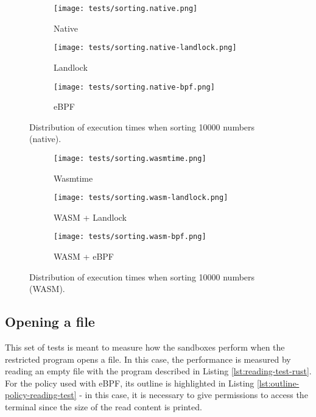 \begin{figure}[ht]
  \centering
  \begin{subfigure}[b]{0.32\textwidth}
    \centering
    \texttt{[image: tests/sorting.native.png]}
    \caption{Native}
  \end{subfigure}
  \begin{subfigure}[b]{0.32\textwidth}
    \centering
    \texttt{[image: tests/sorting.native-landlock.png]}
    \caption{Landlock}
  \end{subfigure}
  \begin{subfigure}[b]{0.32\textwidth}
    \centering
    \texttt{[image: tests/sorting.native-bpf.png]}
    \caption{eBPF}
  \end{subfigure}
  \caption{Distribution of execution times when sorting 10000 numbers (native).}
  \label{fig:distribution-sorting-native}
\end{figure}

\begin{figure}[ht!]
  \centering
  \begin{subfigure}[b]{0.32\textwidth}
    \centering
    \texttt{[image: tests/sorting.wasmtime.png]}
    \caption{Wasmtime}
  \end{subfigure}
  \begin{subfigure}[b]{0.32\textwidth}
    \centering
    \texttt{[image: tests/sorting.wasm-landlock.png]}
    \caption{WASM + Landlock}
  \end{subfigure}
  \begin{subfigure}[b]{0.32\textwidth}
    \centering
    \texttt{[image: tests/sorting.wasm-bpf.png]}
    \caption{WASM + eBPF}
  \end{subfigure}
  \caption{Distribution of execution times when sorting 10000 numbers (WASM).}
  \label{fig:distribution-sorting-wasm}
\end{figure}

\subsection{Opening a file}

This set of tests is meant to measure how the sandboxes perform when the restricted program opens a file.
In this case, the performance is measured by reading an empty file with the program described in Listing \ref{lst:reading-test-rust}.
For the policy used with eBPF, its outline is highlighted in Listing \ref{lst:outline-policy-reading-test}
- in this case, it is necessary to give permissions to access the terminal since the size of the read content is printed. 


